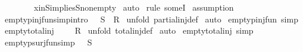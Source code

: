 \begin{isabellebody}
\ \ \ \ \ \ \ \ x{\isacharunderscore}in{\isacharunderscore}S{\isacharunderscore}implies{\isacharunderscore}S{\isacharunderscore}nonempty{\isacharparenright}\isanewline
{}\isamarkupfalse%
\ auto\isanewline
{}\isamarkupfalse%
\ {\isacharparenleft}rule\ someI{\isacharparenright}\isanewline
{}\isamarkupfalse%
\ assumption\isanewline
{}\isamarkupfalse%
%
\endisatagproof
{\isafoldproof}%
%
\isadelimproof
%
\endisadelimproof
%
\isamarkuptrue%
\isamarkupfalse%
\ empty{\isacharunderscore}pinj{\isacharunderscore}fun{\isacharbrackleft}simp{\isacharcomma}intro{\isacharbang}{\isacharbrackright}{\isacharcolon}\ {\isachardoublequoteopen}{\isacharbraceleft}{\isacharbraceright}\ {\isacharcolon}\ {\isacharparenleft}S\ {\isachargreater}{\isacharminus}{\isacharbar}{\isacharminus}{\isachargreater}\ R{\isacharparenright}{\isachardoublequoteclose}\isanewline
%
\isadelimproof
%
\endisadelimproof
%
\isatagproof
{}\isamarkupfalse%
\ {\isacharparenleft}unfold\ partial{\isacharunderscore}inj{\isacharunderscore}def{\isacharparenright}\isanewline
{}\isamarkupfalse%
\ auto\isanewline
{}\isamarkupfalse%
%
\endisatagproof
{\isafoldproof}%
%
\isadelimproof
\isanewline
%
\endisadelimproof
{}\isamarkupfalse%
\ empty{\isacharunderscore}pinj{\isacharunderscore}fun\ {\isacharbrackleft}simp{\isacharbrackright}%
\isamarkuptrue%
\isamarkupfalse%
\ empty{\isacharunderscore}total{\isacharunderscore}inj{\isacharcolon}\ {\isachardoublequoteopen}{\isacharbraceleft}{\isacharbraceright}\ {\isacharcolon}\ {\isacharparenleft}{\isacharbraceleft}{\isacharbraceright}\ {\isachargreater}{\isacharminus}{\isacharminus}{\isachargreater}\ R{\isacharparenright}{\isachardoublequoteclose}\isanewline
%
\isadelimproof
%
\endisadelimproof
%
\isatagproof
{}\isamarkupfalse%
\ {\isacharparenleft}unfold\ total{\isacharunderscore}inj{\isacharunderscore}def{\isacharparenright}\isanewline
{}\isamarkupfalse%
\ auto\isanewline
{}\isamarkupfalse%
%
\endisatagproof
{\isafoldproof}%
%
\isadelimproof
\isanewline
%
\endisadelimproof
{}\isamarkupfalse%
\ empty{\isacharunderscore}total{\isacharunderscore}inj\ {\isacharbrackleft}simp{\isacharbrackright}%
\isamarkuptrue%
\isamarkupfalse%
\ empty{\isacharunderscore}psurj{\isacharunderscore}fun{\isacharbrackleft}simp{\isacharbrackright}{\isacharcolon}\ {\isachardoublequoteopen}{\isacharbraceleft}{\isacharbraceright}\ {\isacharcolon}\ {\isacharparenleft}S\ {\isacharminus}{\isacharbar}{\isacharminus}{\isachargreater}{\isachargreater}\ {\isacharbraceleft}{\isacharbraceright}{\isacharparenright}{\isachardoublequoteclose}\isanewline

\end{isabellebody}
